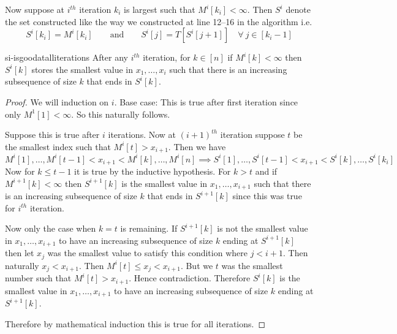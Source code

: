Now suppose at $i^{th}$ iteration $k_i$ is largest such that $M^i[k_i]<\infty$. Then $S^i$ denote the set constructed like the way we constructed at line 12--16 in the algorithm i.e. $$S^i[k_i]=M^i[k_i]\qquad \text{and}\qquad S^i[j]=T[S^i[j+1]]\quad \forall\ j\in[k_i-1]$$
\begin{lemma}{}{si-isgoodatalliterations}
	After any $i^{th}$ iteration, for $k\in[n]$ if $M^i[k]<\infty$ then $S^i[k]$ stores the smallest value in $x_1,\dots, x_i$ such that there is an increasing subsequence of size $k$ that ends in $S^i[k]$.
\end{lemma}
\begin{proof}
We will induction on $i$. Base case: This is true after first iteration since only $M^1[1]<\infty$. So this naturally follows. 

Suppose this is true after $i$ iterations.  Now at $(i+1)^{th}$ iteration suppose $t$ be the smallest index such that $M^i[t]>x_{i+1}$. Then we have $$M^i[1],\dots, M^i[t-1]<x_{i+1}<M^i[k],\dots, M^i[n]\implies S^i[1],\dots, S^i[t-1]<x_{i+1}<S^i[k],\dots, S^i[k_i]$$ Now for $k\leq t-1$ it is true by the inductive hypothesis. For $k>t$ and if $M^{i+1}[k]<\infty$ then $S^{i+1}[k]$ is the smallest value in $x_1,\dots, x_{i+1}$ such that there is an increasing subsequence of size $k$ that ends in $S^{i+1}[k]$ since this was true for $i^{th}$ iteration. 

Now only the case when $k=t$ is remaining. If $S^{i+1}[k]$ is not the smallest value in $x_1,\dots ,x_{i+1}$ to have an increasing subsequence of size $k$ ending at $S^{i+1}[k]$ then let $x_j$ was the smallest value to satisfy this condition where $j<i+1$. Then naturally $x_j<x_{i+1}$. Then $M^{i}[t]\leq x_j<x_{i+1}$. But we $t$ was the smallest number such that $M^{i}[t]>x_{i+1}$. Hence contradiction. Therefore $S^i[k]$ is the smallest value in $x_1,\dots, x_{i+1}$ to have an increasing subsequence of size $k$ ending at $S^{i+1}[k]$. 

Therefore by mathematical induction this is true for all iterations. 
\end{proof}



